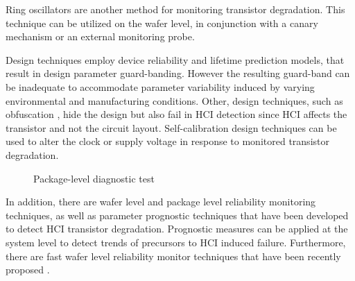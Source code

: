 \documentclass[12pt,conference]{IEEEtran}
\begin{document}
Ring oscillators are another method for monitoring transistor degradation.  \cite{RING92A,RING02A}  This technique can be utilized on the wafer level, in conjunction with a canary mechanism or an external monitoring probe.   

Design techniques employ device reliability and lifetime prediction models, that result in design parameter guard-banding.  \cite{DESIGN06A,DESIGN07A,DESIGN07B} However the resulting guard-band can be inadequate to accommodate parameter variability induced by varying environmental and manufacturing conditions. Other, design techniques, such as obfuscation \cite{DESIGN08A}, hide the design but also fail in HCI detection since HCI affects the transistor and not the circuit layout. Self-calibration design\cite{SOLN07B,SOLN08Y}  techniques can be used to alter the clock or supply voltage in response to monitored transistor degradation.

   
\begin{figure*}[htp]
\caption{Package-level diagnostic test}
\label{figHCI3}
\end{figure*}

In addition, there are wafer level \cite{TRANREL02} and package level reliability monitoring techniques, as well as parameter prognostic techniques \cite{ICOPHM08} that have been developed to detect HCI transistor degradation.  Prognostic measures can be applied at the system level to detect trends of precursors to HCI induced failure. Furthermore, there are fast wafer level reliability monitor techniques that have been recently proposed \cite{SCORED07}. 
\end{document}
